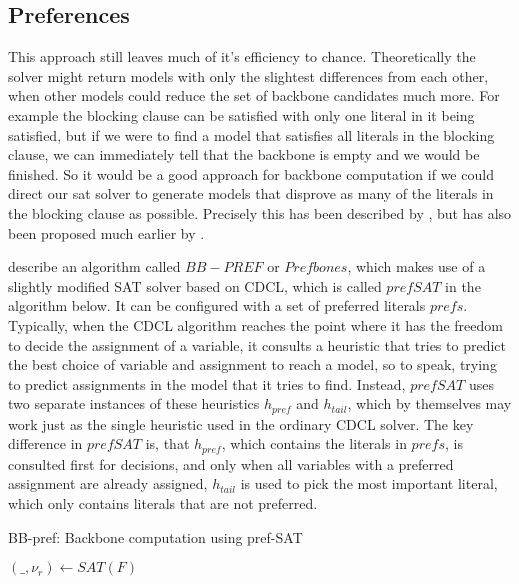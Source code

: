 \subsection{Preferences}
\label{ss:prefs}
This approach still leaves much of it's efficiency to chance. Theoretically the solver might return models with only the slightest differences from each other, when other models could reduce the set of backbone candidates much more. For example the blocking clause can be satisfied with only one literal in it being satisfied, but if we were to find a model that satisfies all literals in the blocking clause, we can immediately tell that the backbone is empty and we would be finished. So it would be a good approach for backbone computation if we could direct our sat solver to generate models that disprove as many of the literals in the blocking clause as possible. Precisely this has been described by \cite{PJ18}, but has also been proposed much earlier by \cite{kk01}. 

\cite{PJ18} describe an algorithm called $BB-PREF$ or $Prefbones$, which makes use of a slightly modified SAT solver based on CDCL, which is called $prefSAT$ in the algorithm below. It can be configured with a set of preferred literals $prefs$. Typically, when the CDCL algorithm reaches the point where it has the freedom to decide the assignment of a variable, it consults a heuristic that tries to predict the best choice of variable and assignment to reach a model, so to speak, trying to predict assignments in the model that it tries to find. Instead, $prefSAT$ uses two separate instances of these heuristics $h_{pref}$ and $h_{tail}$, which by themselves may work just as the single heuristic used in the ordinary CDCL solver. The key difference in $prefSAT$ is, that $h_{pref}$, which contains the literals in $prefs$,  is consulted first for decisions, and only when all variables with a preferred assignment are already assigned, $h_{tail}$ is used to pick the most important literal, which only contains literals that are not preferred.


\begin{algorithm}
\caption{{\sc BB-pref: Backbone computation using pref-SAT}}
\label{alg:pb0}
\DontPrintSemicolon
{}

$(\_,\nu_r) \gets SAT(F) $\;

\end{algorithm}

